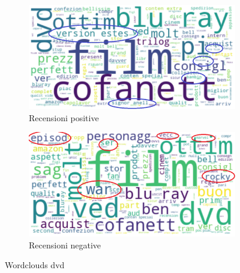 				\begin{figure} [h]
					\centering
					\begin{subfigure}{0.48\textwidth}
						\includegraphics[width=\textwidth]{Figure/top_positive_dvd}
						\caption{Recensioni positive}
						\label{fig:top_positive_dvd}
					\end{subfigure}
					\begin{subfigure}{0.48\textwidth}
						\includegraphics[width=\textwidth]{Figure/top_negative_dvd}
						\caption{Recensioni negative}
						\label{fig:top_negative_dvd}
					\end{subfigure}
					\caption{Wordclouds dvd}\label{fig:wordclouds_dvd}
				\end{figure}
			
